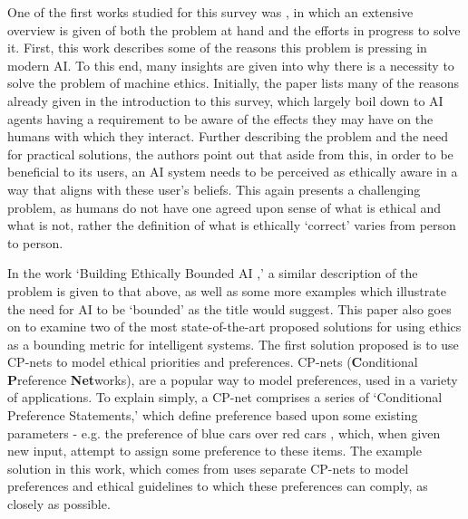 \documentclass{svproc}
\begin{document}
\par
One of the first works studied for this survey was \cite{anderson:anderson}, in which an extensive overview is given of both the problem at hand and the efforts in progress to solve it. First, this work describes some of the reasons this problem is pressing in modern AI. To this end, many insights are given into why there is a necessity to solve the problem of machine ethics. Initially, the paper lists many of the reasons already given in the introduction to this survey, which largely boil down to AI agents having a requirement to be aware of the effects they may have on the humans with which they interact. Further describing the problem and the need for practical solutions, the authors point out that aside from this, in order to be beneficial to its users, an AI system needs to be perceived as ethically aware in a way that aligns with these user's beliefs. This again presents a challenging problem, as humans do not have one agreed upon sense of what is ethical and what is not, rather the definition of what is ethically `correct' varies from person to person.
\par
In the work `Building Ethically Bounded AI \cite{rossi:mattei},' a similar description of the problem is given to that above, as well as some more examples which illustrate the need for AI to be `bounded' as the title would suggest. This paper also goes on to examine two of the most state-of-the-art proposed solutions for using ethics as a bounding metric for intelligent systems. The first solution proposed is to use CP-nets to model ethical priorities and preferences. CP-nets (\textbf{C}onditional \textbf{P}reference \textbf{Net}works), are a popular way to model preferences, used in a variety of applications. To explain simply, a CP-net comprises a series of `Conditional Preference Statements,' which define preference based upon some existing parameters - e.g. the preference of blue cars over red cars \cite{rossi:mattei}, which, when given new input, attempt to assign some preference to these items.
The example solution in this work, which comes from \cite{loreggia} uses separate CP-nets to model preferences and ethical guidelines to which these preferences can comply, as closely as possible.
\end{document}
